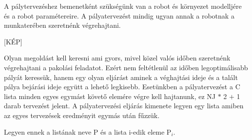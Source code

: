 A pálytervezéshez bemenetként szükségünk van a robot és környezet modelljére és a robot paramétereire. A pályatervezést mindig ugyan annak a robotnak a munkaterében szeretnénk végrehajtani. 

[KÉP]

Olyan megoldást kell keresni ami gyors, mivel közel valós időben szeretnénk végrehajtani a pakolási feladatot. Ezért nem feltétlenül az időben legoptimálisabb pályát keressük, hanem egy olyan eljárást aminek a véghajtási ideje és a talált pálya bejárási ideje együtt a lehető legkisebb. Esetünkben a pályatervezést a C lista minden egyes egymást követő elemére végre kell hajtanunk, ez NJ $*$ 2 $+$ 1 darab tervezést jelent. A pályatervezési eljárás kimenete legyen egy lista amiben az egyes tervezések eredményit egymás után fűzzük.

Legyen ennek a listának neve P és a lista i-edik eleme P$_i$.